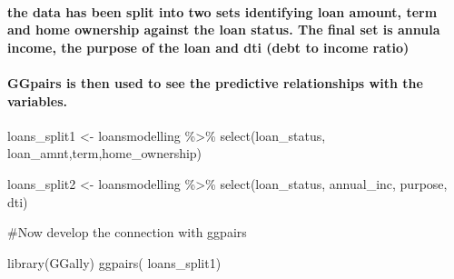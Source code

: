 \documentclass[
]{article}
\newenvironment{Shaded}{\begin{snugshade}}{\end{snugshade}}
\newcommand{\FunctionTok}[1]{\textcolor[rgb]{0.00,0.00,0.00}{#1}}
\newcommand{\NormalTok}[1]{#1}
\newcommand{\OtherTok}[1]{\textcolor[rgb]{0.56,0.35,0.01}{#1}}
\newcommand{\SpecialCharTok}[1]{\textcolor[rgb]{0.00,0.00,0.00}{#1}}
\begin{document}
\hypertarget{the-data-has-been-split-into-two-sets-identifying-loan-amount-term-and-home-ownership-against-the-loan-status.-the-final-set-is-annula-income-the-purpose-of-the-loan-and-dti-debt-to-income-ratio}{%
\paragraph{the data has been split into two sets identifying loan
amount, term and home ownership against the loan status. The final set
is annula income, the purpose of the loan and dti (debt to income
ratio)}\label{the-data-has-been-split-into-two-sets-identifying-loan-amount-term-and-home-ownership-against-the-loan-status.-the-final-set-is-annula-income-the-purpose-of-the-loan-and-dti-debt-to-income-ratio}}

\hypertarget{ggpairs-is-then-used-to-see-the-predictive-relationships-with-the-variables.}{%
\paragraph{GGpairs is then used to see the predictive relationships with
the
variables.}\label{ggpairs-is-then-used-to-see-the-predictive-relationships-with-the-variables.}}

\begin{Shaded}
\begin{Highlighting}[]
\NormalTok{loans\_split1 }\OtherTok{\textless{}{-}}\NormalTok{ loansmodelling }\SpecialCharTok{\%\textgreater{}\%}
  \FunctionTok{select}\NormalTok{(loan\_status, loan\_amnt,term,home\_ownership)}
\end{Highlighting}
\end{Shaded}

\begin{Shaded}
\begin{Highlighting}[]
\NormalTok{loans\_split2 }\OtherTok{\textless{}{-}}\NormalTok{ loansmodelling }\SpecialCharTok{\%\textgreater{}\%}
  \FunctionTok{select}\NormalTok{(loan\_status, annual\_inc, purpose, dti)}
\end{Highlighting}
\end{Shaded}

\#Now develop the connection with ggpairs

\begin{Shaded}
\begin{Highlighting}[]
\FunctionTok{library}\NormalTok{(GGally)}
\FunctionTok{ggpairs}\NormalTok{( loans\_split1)}
\end{Highlighting}
\end{Shaded}
\end{document}
